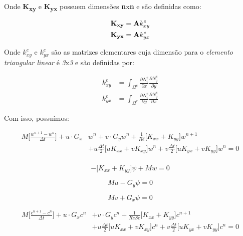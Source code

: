 \medskip
Onde \textbf{K\textsubscript{xy}} e \textbf{K\textsubscript{yx}} 
possuem dimensões \textbf{n}x\textbf{n}
e são definidas como:

\begin{align}
  \textbf{K\textsubscript{xy}} & = \textbf{A} k_{xy}^{e} \\
  \textbf{K\textsubscript{yx}} & = \textbf{A} k_{yx}^{e}
\end{align}

\medskip
Onde 
$k^{e}_{xy}$ e
$k^{e}_{yx}$
são as matrizes elementares cuja dimensão para o 
\textit{elemento triangular linear} é \textit{3}x\textit{3} e 
são definidas por:


\begin{equation}
 \begin{aligned}
  k_{xy}^{e} & = \int_{\Omega^{e}} \frac{\partial N_{i}^{e}}{\partial x} \frac{\partial N_{j}^{e}}{\partial y} \\
  k_{yx}^{e} & = \int_{\Omega^{e}} \frac{\partial N_{i}^{e}}{\partial y} \frac{\partial N_{j}^{e}}{\partial x}
 \end{aligned}
\end{equation}


\medskip
Com isso, possuímos:

\begin{equation}
\begin{aligned}
 M \bigg[ \frac{w^{n+1} - w^{n}}{\Delta t} \bigg]
 + u \cdot G_x & w^{n}
 + v \cdot G_y w^{n} 
 + \frac{1}{\textit{Re}} \Big[ K_{xx} + K_{yy} \Big] w^{n+1} \\
 & + u
 \frac{\Delta t}{2}
 \big[
 u K_{xx}
 + v K_{xy}
 \big]
 w^{n} 
 + v
 \frac{\Delta t}{2}
 \Big[
 u K_{yx}
 + v K_{yy}
 \Big]
 w^{n} 
 = 0 \\
\end{aligned}
\end{equation}

\begin{equation}
 - \Big[ K_{xx} + K_{yy} \Big] \psi + Mw  = 0
\end{equation}

\begin{equation}
 Mu - G_y \psi = 0
\end{equation}

\begin{equation}
 Mv + G_x \psi = 0
\end{equation}

\begin{equation}
\begin{aligned}
 M \bigg[ \frac{c^{n+1} - c^{n}}{\Delta t} \bigg]
 + u \cdot G_x c^{n}
 & + v \cdot G_y c^{n} 
 + \frac{1}{\textit{ReSc}} \Big[ K_{xx} + K_{yy} \Big] c^{n+1} \\
 & + u
 \frac{\Delta t}{2}
 \big[
 u K_{xx}
 + v K_{xy}
 \big]
 c^{n}
 + v
 \frac{\Delta t}{2}
 \Big[
 u K_{yx}
 + v K_{yy}
 \Big]
 c^{n}
 = 0  
\end{aligned} 
\end{equation}

